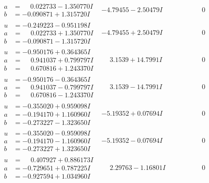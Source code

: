 \documentclass[1p]{elsarticle_modified}
\theoremstyle{definition}
\begin{document}
$$\begin{array}{c|c|c}
\begin{aligned}
a &= \phantom{-}0.022733 - 1.350770 I \\
b &= -0.090871 + 1.315720 I\end{aligned}
 & -4.79455 - 2.50479 I & \phantom{-0.000000 } 0 \\ \hline\begin{aligned}
u &= -0.249223 - 0.951198 I \\
a &= \phantom{-}0.022733 + 1.350770 I \\
b &= -0.090871 - 1.315720 I\end{aligned}
 & -4.79455 + 2.50479 I & \phantom{-0.000000 } 0 \\ \hline\begin{aligned}
u &= -0.950176 + 0.364365 I \\
a &= \phantom{-}0.941037 + 0.799797 I \\
b &= \phantom{-}0.670816 + 1.243370 I\end{aligned}
 & \phantom{-}3.1539 + 14.7991 I & \phantom{-0.000000 } 0 \\ \hline\begin{aligned}
u &= -0.950176 - 0.364365 I \\
a &= \phantom{-}0.941037 - 0.799797 I \\
b &= \phantom{-}0.670816 - 1.243370 I\end{aligned}
 & \phantom{-}3.1539 - 14.7991 I & \phantom{-0.000000 } 0 \\ \hline\begin{aligned}
u &= -0.355020 + 0.959098 I \\
a &= -0.194170 + 1.160960 I \\
b &= -0.273227 - 1.323650 I\end{aligned}
 & -5.19352 + 0.07694 I & \phantom{-0.000000 } 0 \\ \hline\begin{aligned}
u &= -0.355020 - 0.959098 I \\
a &= -0.194170 - 1.160960 I \\
b &= -0.273227 + 1.323650 I\end{aligned}
 & -5.19352 - 0.07694 I & \phantom{-0.000000 } 0 \\ \hline\begin{aligned}
u &= \phantom{-}0.407927 + 0.886173 I \\
a &= -0.729651 + 0.787225 I \\
b &= -0.927594 + 1.034960 I\end{aligned}
 & \phantom{-}2.29763 - 1.16801 I & \phantom{-0.000000 } 0 \\ \hline\begin{aligned}

\end{aligned}
\end{array}$$
\end{document}
